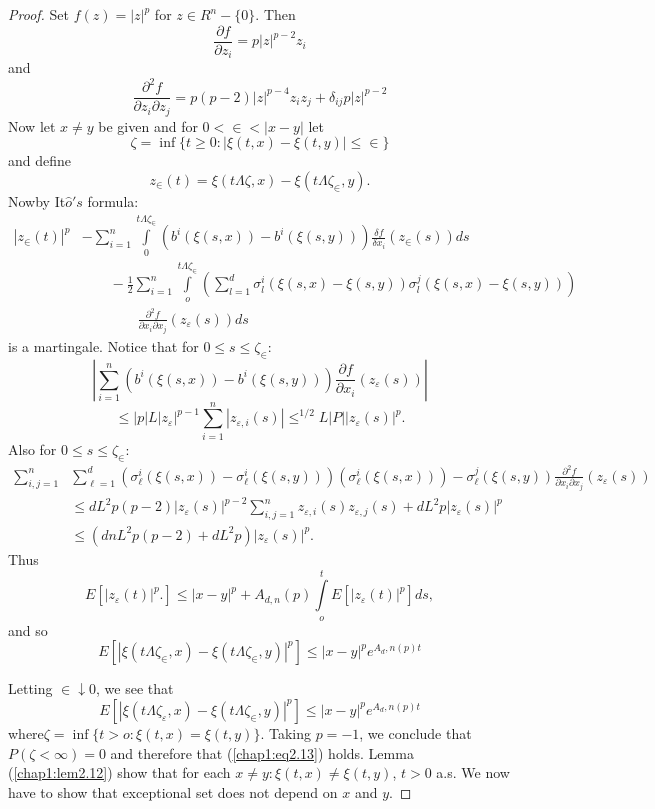 \begin{proof}
Set $f(z)=|z|^p$ for $z \in R^n-\{0 \}$. Then
$$
\frac {\partial f}{\partial z_i}= p|z|^{p-2}z_i
$$
and
$$
\frac{\partial^2 f}{\partial z_i \partial z_j}= p(p-2)|z|^{p-4}z_iz_j
+\delta_{ij}p|z|^{p-2} 
$$
Now let $x \neq y$ be given and for $0< \in < |x-y|$ let  
$$
\zeta = \inf \{ t \ge 0: |\xi(t,x)-\xi (t,y)| \le \in \} 
$$
and define
$$
z_ \in (t)=\xi (t \Lambda \zeta ,x)-\xi (t \Lambda \zeta_\in,y). 
$$
Now\pageoriginale by It$\hat{o}'s$ formula:
\begin{align*}
|z_\in (t)|^p &- \sum _{i=1}^n \int\limits^{t \Lambda \zeta_\in}_0
(b^i(\xi(s,x))-b^i(\xi(s,y)))\frac{\delta f}{\delta x_i}(z_\in (s))ds
\\ 
&\qquad - \frac{1}{2}\sum _{i=1}^n \int\limits^{t \Lambda \zeta_\in}_o (\sum
_{l=1}^d \sigma^i_l (\xi (s,x)- \xi(s,y))\sigma^j_l (\xi
(s,x)-\xi(s,y))) \\
& \qquad \qquad  \frac{\partial^2 f}{\partial x_i\partial x_j}(z_\varepsilon
(s))ds 
\end{align*} 
is a martingale. Notice that for $0 \le s \le \zeta_\in$:
$$
| \sum _{i=1}^n (b^i(\xi(s,x))-b^i(\xi(s,y))) \frac{\partial
  f}{\partial x_i}(z_\varepsilon (s))| 
$$
$$
\le |p|L|z_\varepsilon|^{p-1} \sum _{i=1}^n|z_{\varepsilon,i}(s)|
\le^{1/2}L|P||z_\varepsilon (s)|^p. 
$$
Also for $0 \le s \le \zeta_ \in$:
\begin{align*}
\sum _{i,j=1}^n& \sum_{\ell=1}^d (\sigma^i_\ell (\xi(s,x))-\sigma^i_\ell
(\xi(s,y)))(\sigma^i_\ell (\xi(s,x))) -\sigma^j_\ell (\xi(s,y))
\frac{\partial^2 f}{\partial x_i \partial x_j}(z_\varepsilon (s)) \\
& \le dL^2 p(p-2)|z_\varepsilon (s)|^{p-2}\sum_{i,j=1}^n
z_{\varepsilon,i}(s)z_{\varepsilon,j}(s)+dL^2p|z_\varepsilon (s)|^p\\  
& \le (dn L^2 p(p-2)+dL^2p)|z_\varepsilon (s)|^p. 
\end{align*}
Thus
$$
E[|z_\varepsilon (t)|^p.]\le |x-y|^p +A_{d,n}(p) \int\limits^t_o
E[|z_\varepsilon (t)|^p]ds, 
$$
and so  
$$
E[|\xi (t \Lambda \zeta_ \in,x)-\xi(t \Lambda \zeta_ \in,y)|^p]
\le|x-y|^p e^{A_d,n(p)t} 
$$

Letting $\in \downarrow 0$, we see that 
$$
E[|\xi (t \Lambda \zeta_ \varepsilon,x)-\xi(t \Lambda \zeta_
  \in,y)|^p] \le|x-y|^p e^{A_d,n(p)t} 
$$
where\pageoriginale $\zeta= \inf \{ t>o:\xi(t,x)= \xi(t,y) \}$. Taking
$p=-1$, we  conclude that $P(\zeta< \infty)=0$ and therefore that
(\ref{chap1:eq2.13}) holds. Lemma (\ref{chap1:lem2.12}) show that for
each $x \neq 
y:\xi(t,x) \neq \xi (t,y)$, $t>0$ a.s. We now have to show that
exceptional set does not depend on $x$ and $y$.  
\end{proof}


